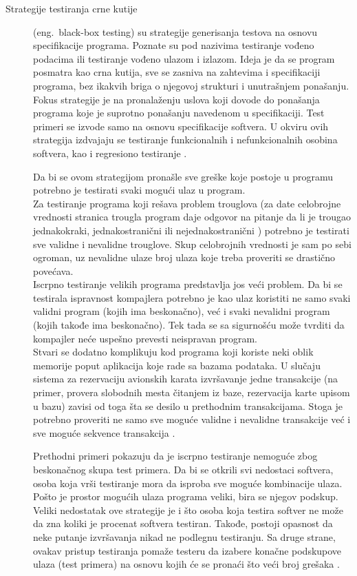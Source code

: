 \documentclass[12pt,oneside]{memoir}
\begin{document}
\begin{description}
\item [Strategije testiranja crne kutije] (eng.~black-box testing) su strategije generisanja testova na osnovu specifikacije programa. Poznate su pod nazivima testiranje vođeno podacima ili testiranje vođeno ulazom i izlazom. Ideja je da se program posmatra kao crna kutija, sve se zasniva na zahtevima i specifikaciji programa, bez ikakvih briga o njegovoj strukturi i unutrašnjem ponašanju. Fokus strategije je na pronalaženju uslova koji dovode do ponašanja programa koje je suprotno ponašanju navedenom u specifikaciji. Test primeri se izvode samo na osnovu specifikacije softvera. U okviru ovih strategija izdvajaju se testiranje funkcionalnih i nefunkcionalnih osobina softvera, kao i regresiono testiranje \cite{mvj, ArtOfST, PGtSTD}.

Da bi se ovom strategijom pronašle sve greške koje postoje u programu potrebno je testirati svaki mogući ulaz u program. \\
Za testiranje programa koji rešava problem trouglova (za date celobrojne vrednosti stranica trougla program daje odgovor na pitanje da li je trougao jednakokraki, jednakostranični ili nejednakostranični \cite{schlingloff} %
) potrebno je testirati sve validne i nevalidne trouglove. Skup celobrojnih vrednosti je sam po sebi ogroman, uz nevalidne ulaze broj ulaza koje treba proveriti se drastično povećava.\\
Iscrpno testiranje velikih programa predstavlja jos veći problem. Da bi se testirala ispravnost kompajlera potrebno je kao ulaz koristiti ne samo svaki validni program (kojih ima beskonačno), već i svaki nevalidni program (kojih takođe ima beskonačno). Tek tada se sa sigurnošću može tvrditi da kompajler neće uspešno prevesti neispravan program. \\
Stvari se dodatno komplikuju kod programa koji koriste neki oblik memorije poput aplikacija koje rade sa bazama podataka. U slučaju sistema za rezervaciju avionskih karata izvršavanje jedne transakcije (na primer, provera slobodnih mesta čitanjem iz baze, rezervacija karte upisom u bazu) zavisi od toga šta se desilo u prethodnim transakcijama. Stoga je potrebno proveriti ne samo sve moguće validne i nevalidne transakcije već i sve moguće sekvence transakcija \cite{ArtOfST}.

Prethodni primeri pokazuju da je iscrpno testiranje nemoguće zbog beskonačnog skupa test primera.  Da bi se otkrili svi nedostaci softvera, osoba koja vrši testiranje mora da isproba sve moguće kombinacije ulaza. Pošto je prostor mogućih ulaza programa veliki, bira se njegov podskup. Veliki nedostatak ove strategije je i što osoba koja testira softver ne može da zna koliki je procenat softvera testiran. Takođe, postoji opasnost da neke putanje izvršavanja nikad ne podlegnu testiranju. Sa druge strane, ovakav pristup testiranja pomaže testeru da izabere konačne podskupove ulaza (test primera) na osnovu kojih će se pronaći što veći broj grešaka \cite{ArtOfST, PGtSTD}.


\end{description}
\end{document}
